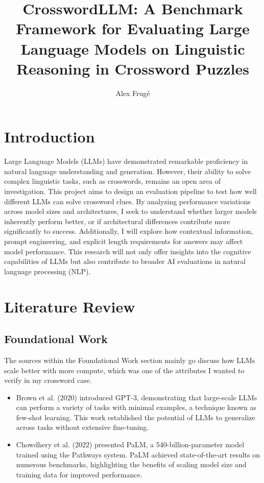 \documentclass[
	a4paper, %
	10pt, %
	unnumberedsections, %
	twoside, %
]{LTJournalArticle}
\title{CrosswordLLM: A Benchmark Framework for Evaluating Large Language Models on Linguistic Reasoning in Crossword Puzzles} %
\author{%
	Alex Frugé
}
\begin{document}
\maketitle %


\section{Introduction}

Large Language Models (LLMs) have demonstrated remarkable proficiency in natural language
understanding and generation. However, their ability to solve complex linguistic tasks, such as crosswords, remains an open area of investigation. This project aims to design an evaluation pipeline to test how well different LLMs can solve crossword clues. By analyzing performance variations across model sizes and architectures, I seek to understand whether larger models inherently perform better, or if architectural differences contribute more significantly to success. Additionally, I will explore how contextual information, prompt engineering, and explicit length requirements for answers may affect model performance. This research will not only offer insights into the cognitive capabilities of LLMs but also contribute to broader AI evaluations in natural language processing (NLP).


\section{Literature Review}

\subsection{Foundational Work}

The sources within the Foundational Work section mainly go discuss how LLMs scale better with more compute, which was one of the attributes I wanted to verify in my crossword case.

\begin{itemize}
	\item Brown et al. (2020) introduced GPT-3, demonstrating that large-scale LLMs can perform a variety of tasks with minimal examples, a technique known as few-shot learning. This work established the potential of LLMs to generalize across tasks without extensive fine-tuning.
	\item Chowdhery et al. (2022) presented PaLM, a 540-billion-parameter model trained using the Pathways system. PaLM achieved state-of-the-art results on numerous benchmarks, highlighting the benefits of scaling model size and training data for improved performance.
\end{itemize}
\end{document}
